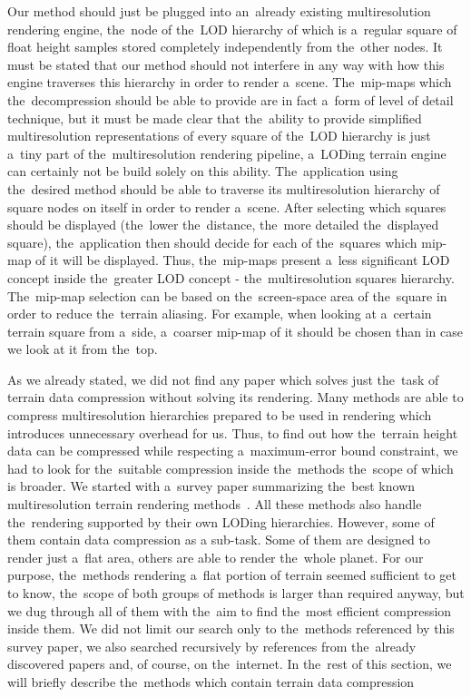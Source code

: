 Our method should just be plugged into an~already existing multiresolution rendering engine, the~node of the~LOD hierarchy of which is a~regular square of float height samples stored completely independently from the~other nodes. It must be stated that our method should not interfere in any way with how this engine traverses this hierarchy in order to render a~scene. The~mip-maps which the~decompression should be able to provide are in fact a~form of level of detail technique, but it must be made clear that the~ability to provide simplified multiresolution representations of every square of the~LOD hierarchy is just a~tiny part of the~multiresolution rendering pipeline, a~LODing terrain engine can certainly not be build solely on this ability. The~application using the~desired method should be able to traverse its multiresolution hierarchy of square nodes on itself in order to render a~scene. After selecting which squares should be displayed (the~lower the~distance, the~more detailed the~displayed square), the~application then should decide for each of the~squares which mip-map of it will be displayed. Thus, the~mip-maps present a~less significant LOD concept inside the~greater LOD concept - the~multiresolution squares hierarchy. The~mip-map selection can be based on the~screen-space area of the~square in order to reduce the~terrain aliasing. For example, when looking at a~certain terrain square from a~side, a~coarser mip-map of it should be chosen than in case we look at it from the~top.

As we already stated, we did not find any paper which solves just the~task of terrain data compression without solving its rendering. Many methods are able to compress multiresolution hierarchies prepared to be used in rendering which introduces unnecessary overhead for us. Thus, to find out how the~terrain height data can be compressed while respecting a~maximum-error bound constraint, we had to look for the~suitable compression inside the~methods the~scope of which is broader. We started with a~survey paper summarizing the~best known multiresolution terrain rendering methods~\cite{survey}. All these methods also handle the~rendering supported by their own LODing hierarchies. However, some of them contain data compression as a sub-task. Some of them are designed to render just a~flat area, others are able to render the~whole planet. For our purpose, the~methods rendering a~flat portion of terrain seemed sufficient to get to know, the~scope of both groups of methods is larger than required anyway, but we dug through all of them with the~aim to find the~most efficient compression inside them. We did not limit our search only to the~methods referenced by this survey paper, we also searched recursively by references from the~already discovered papers and, of course, on the~internet. In the~rest of this section, we will briefly describe the~methods which contain terrain data compression


